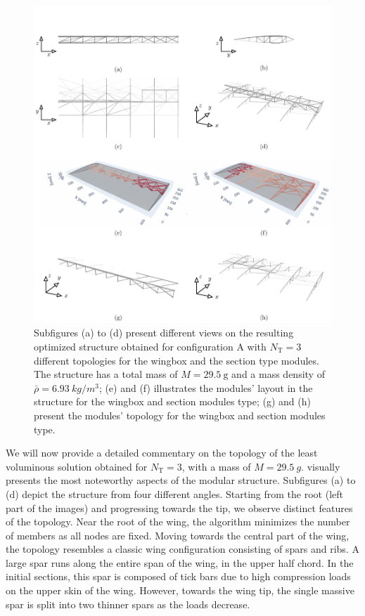 \begin{figure}
    \centering
    \includegraphics[width=\linewidth]{figures/07_aeronautic/00_NACA_a_sol_3/gs_a.pdf}
        \caption{Subfigures (a) to (d) present different views on the resulting optimized structure obtained for configuration A with $N_\text{T}=3$ different topologies for the wingbox and the section type modules. The structure has a total mass of $M=\qty{29.5}{\gram}$ and a mass density of $\bar{\rho}=\qty{6.93}{kg/m^3}$; (e) and (f) illustrates the modules' layout in the structure for the wingbox and section modules type; (g) and (h) present the modules' topology for the wingbox and section modules type.}
    \label{fig:07_naca_sol_a_nt3}
\end{figure}

We will now provide a detailed commentary on the topology of the least voluminous solution obtained for $N_\text{T}=3$, with a mass of $M=\qty{29.5}{g}$.  visually presents the most noteworthy aspects of the modular structure. Subfigures (a) to (d) depict the structure from four different angles. Starting from the root (left part of the images) and progressing towards the tip, we observe distinct features of the topology. Near the root of the wing, the algorithm minimizes the number of members as all nodes are fixed. Moving towards the central part of the wing, the topology resembles a classic wing configuration consisting of spars and ribs. A large spar runs along the entire span of the wing, in the upper half chord. In the initial sections, this spar is composed of tick bars due to high compression loads on the upper skin of the wing. However, towards the wing tip, the single massive spar is split into two thinner spars as the loads decrease.

